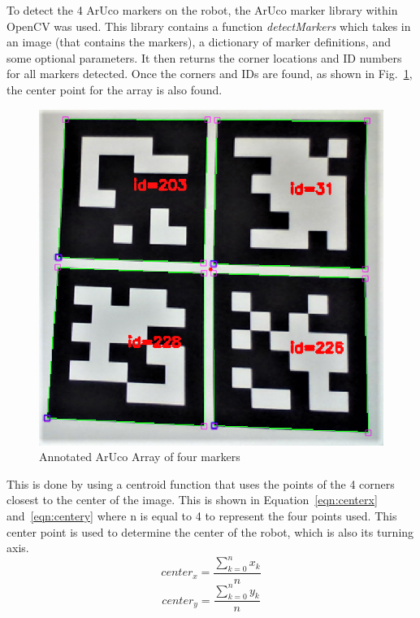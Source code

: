 \documentclass[12pt,american]{report}
\begin{document}
To detect the 4 ArUco markers on the robot, the ArUco marker library within OpenCV was used. This library contains a function \textit{detectMarkers} which takes in an image (that contains the markers), a dictionary of marker definitions, and some optional parameters. It then returns the corner locations and ID numbers for all markers detected.  Once the corners and IDs are found, as shown in Fig.~\ref{fig:ArUcodetected}, the center point for the array is also found.  
\begin{figure}[h!]
\centering
\includegraphics[scale=.5]{images/ArucoDetected.PNG}
\caption{Annotated ArUco Array of four markers}
\label{fig:ArUcodetected}
\end{figure}
This is done by using a centroid function that uses the points of the 4 corners closest to the center of the image.  This is shown in Equation~\ref{eqn:centerx} and~\ref{eqn:centery} where n is equal to 4 to represent the four points used.  This center point is used to determine the center of the robot, which is also its turning axis. 
\begin{equation}
center_x = \frac{\sum_{k=0}^{n}{x_k}}{n}
\label{eqn:centerx}
\end{equation}
\begin{equation}
center_y = \frac{\sum_{k=0}^{n}{y_k}}{n}
\label{eqn:centery}
\end{equation}
\end{document}
